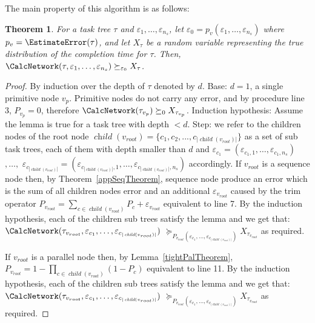 \documentclass{article}
\newtheorem{theorem}{Theorem}
\DeclareMathOperator{\ch}{\textit{child}}
\begin{document}
The main property of this algorithm is as follows:

\begin{theorem}\label{theorem:approxEps0}
	For a task tree $\tau$ and $\varepsilon_1, \dots, \varepsilon_{n_s}$, let 
	$\varepsilon_0=p_v(\varepsilon_1, \dots, \varepsilon_{n_s}) $ where $p_v=\EstimateError(\tau)$, 
	and let $X_{\tau}$ be a random variable representing the true
	distribution of the completion time for $\tau$. Then,
	$\CalcNetwork(\tau, \varepsilon_1, \dots, \varepsilon_{n_s}) \succeq_{\varepsilon_0} X_{\tau}$.
\end{theorem}

\begin{proof}
	By induction over the depth of $\tau$ denoted by $d$. Base: $ d=1$, a single primitive node $ v_p 
	$. Primitive nodes do not carry any error, and by procedure \EstimateError line 3, $P_{v_p}=0$, 
	therefore  $\CalcNetwork(\tau_{v_p}) \succeq_0 X_{\tau_{v_p}}$. 
	Induction hypothesis: Assume the lemma is true for a task tree with depth $ <d $. Step: we refer to the children nodes of the root node $\ch(v_{root})= \lbrace c_1, c_2,...,c_{|\ch(v_{root})|}\rbrace$ as a set of sub task trees, each of them with depth smaller than $ d $ and $\varepsilon_{c_1}=(\varepsilon_{c_1,1}, \dots,\varepsilon_{c_1,n_s})$ $, \dots, $  $\varepsilon_{c_{|\ch(v_{root})|}} = (\varepsilon_{c_{|\ch(v_{root})|},1}, \dots, \varepsilon_{c_{|\ch(v_{root})|},n_s})$ accordingly. 
	If $v_{root}$ is a sequence node then,
	by Theorem~\ref{appSeqTheorem}, sequence node produce an error which is the sum of all children nodes error and an additional $\varepsilon_{v_{root}}$ caused by the trim operator $P_{v_{root}}={\sum_{c \in \ch(v_{root})}{P_{c}}+ \varepsilon_{v_{root}}}$ equivalent to \EstimateError line 7. By the induction hypothesis, each of the children sub trees satisfy the lemma and we get that:$ \CalcNetwork(\tau_{v_{root}}, \varepsilon_{c_1}, \dots, \varepsilon_{c_{|\ch(v_{root})|}})$ $\succeq_{P_{v_{root}}(\varepsilon_{c_1}, \dots, \varepsilon_{c_{|\ch(v_{root})|}})} X_{\tau_{v_{root}}} $ as required.
	
	If $v_{root}$ is a parallel node then,
	by Lemma~\ref{tightPalTheorem}, $P_{v_{root}}=1-\prod_{c \in \ch(v_{root})}{(1-P_{c})}$ equivalent to \EstimateError line 11. By the induction hypothesis, each of the children sub trees satisfy the lemma and we get that:$ \CalcNetwork(\tau_{v_{root}}, \varepsilon_{c_1}, \dots, \varepsilon_{c_{|\ch(v_{root})|}})$ $\succeq_{P_{v_{root}}(\varepsilon_{c_1}, \dots, \varepsilon_{c_{|\ch(v_{root})|}})} X_{\tau_{v_{root}}} $ as required.
\end{proof}
\end{document}

